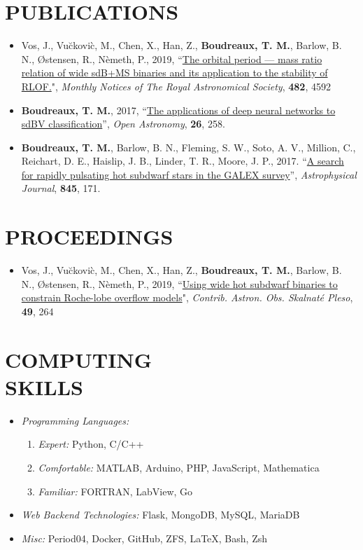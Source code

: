 \documentclass[margin, 10pt]{res} %
\begin{document}
\begin{resume}
\section{PUBLICATIONS}
\begin{itemize}
\item Vos, J., Vu\u{c}kovi\`c, M., Chen, X., Han, Z., \textbf{Boudreaux, T. M.}, Barlow, B. N., \O stensen, R., N\`emeth, P., 2019, ``\href{https://ui.adsabs.harvard.edu/#abs/2019MNRAS.482.4592V/abstract}{The orbital period --- mass ratio relation of wide sdB+MS binaries and its application to the stability of RLOF.}", \textit{Monthly Notices of The Royal Astronomical Society}, \textbf{482}, 4592 
\item \textbf{Boudreaux, T. M.}, 2017, ``\href{https://ui.adsabs.harvard.edu/#abs/2017OAst...26..258B/abstract}{The applications of deep neural networks to sdBV classification}'', \textit{Open Astronomy}, \textbf{26}, 258.
\item \textbf{Boudreaux, T. M.}, Barlow, B. N., Fleming, S. W., Soto, A. V., Million, C., Reichart, D. E., Haislip, J. B., Linder, T. R., Moore, J. P., 2017. ``\href{https://ui.adsabs.harvard.edu/#abs/2017ApJ...845..171B/abstract}{A search for rapidly pulsating hot subdwarf stars in the GALEX survey}'', \textit{Astrophysical Journal}, \textbf{845}, 171.
\end{itemize}

\section{PROCEEDINGS}
\begin{itemize}
\item Vos, J., Vu\u{c}kovi\`c, M., Chen, X., Han, Z., \textbf{Boudreaux, T. M.}, Barlow, B. N., \O stensen, R., N\`emeth, P., 2019, ``\href{http://www.ta3.sk/caosp/Eedition/FullTexts/vol49no2/pp264-270.pdf}{Using wide hot subdwarf binaries to constrain Roche-lobe overflow models}", \textit{Contrib. Astron. Obs. Skalnaté Pleso}, \textbf{49}, 264 
\end{itemize}

\section{COMPUTING \\ SKILLS} 

\begin{itemize}
\item {\sl Programming Languages:} 
    \begin{enumerate}
        \item{\sl Expert: } Python, C/C++
        \item{\sl Comfortable: } MATLAB, Arduino, PHP, JavaScript, Mathematica
        \item{\sl Familiar: } FORTRAN, LabView, Go 
    \end{enumerate}
\item {\sl Web Backend Technologies:} Flask, MongoDB, MySQL, MariaDB
\item {\sl Misc:} Period04, Docker, GitHub, ZFS, LaTeX, Bash, Zsh
\end{itemize}
 

\end{resume}
\end{document}

